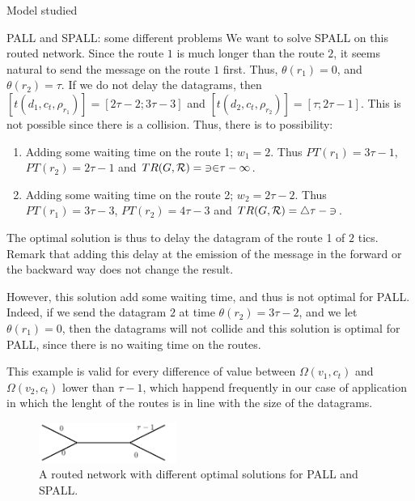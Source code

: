 \documentclass[10pt]{article}
\newcommand\pall{\textsc{PALL}\xspace}
\newcommand\spall{\textsc{SPALL}\xspace}
\begin{document}
\begin{section}{Model studied }
\begin{subsection}{\pall and \spall: some different problems}
  We want to solve \spall on this routed network. Since the route $1$ is much longer than the route $2$, it seems natural to send the message on the route $1$ first. Thus, $\theta(r_1) = 0$, and $\theta (r_2) = \tau $. If we do not delay the datagrams, then $[t(d_1,c_t,\rho_{r_1})] = [2\tau -2;3\tau-3]$ and $[t(d_2,c_t,\rho_{r_2})] = [\tau;2\tau-1]$. This is not possible since there is a collision. 
  Thus, there is to possibility: 
  \begin{enumerate}
                                                                                                                                                                                                                                                                                                                                                                                                                                               \item Adding some waiting time on the route 1; $w_1 = 2$. Thus $PT(r_1) = 3\tau-1$, $PT(r_2) = 2\tau -1$ and $TR(G,\cal{R}) =32\tau-1$. 
\item Adding some waiting time on the route 2; $w_2 = 2\tau-2$. Thus $PT(r_1) = 3\tau-3$, $PT(r_2) = 4\tau -3$ and $TR(G,\cal{R}) = 4\tau-3$.                                                                                                                                                                                                                                                             \end{enumerate}
The optimal solution is thus to delay the datagram of the route 1 of $2$ tics. Remark that adding this delay at the emission of the message in the forward or the backward way does not change the result.

However, this solution add some waiting time, and thus is not optimal for \pall. Indeed, if we send the datagram $2$ at time  $\theta (r_2) = 3\tau-2 $, and we let $\theta(r_1) = 0$, then the datagrams will not collide and this solution is optimal for \pall, since there is no waiting time on the routes.

This example is valid for every difference of value between $\Omega(v_1,c_t)$ and $\Omega(v_2,c_t)$ lower than $\tau -1$, which happend frequently in our case of application in which the lenght of the routes is in line with the size of the datagrams.

  \begin{figure}
  \begin{center}
 \includegraphics[width=0.4\textwidth]{examplestar}
\caption{A routed network with different optimal solutions for PALL and SPALL.}\label{fig:pallpallexample}
\end{center}
\end{figure}
  
    \end{subsection}
  \end{section}
\end{document}
